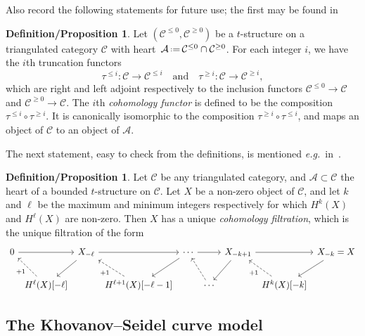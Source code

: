 \documentclass{amsart}
\theoremstyle{definition}
\newtheorem{defprop}[theorem]{Definition/Proposition}
\newcommand{\eqdef}{\mbox{\,\raisebox{0.2ex}{\scriptsize\ensuremath{\mathrm:}}\ensuremath{=}\,}} %
\newcommand{\eg}{\textit{e.g.}~} %
\newcommand{\darkblue}{\color{darkblue}} %
\newcommand{\defn}[1]{\textsl{\darkblue #1}} %
\begin{document}
Also record the following statements for future use; the first may be found in~\cite[Sect.~1.3]{bel.ber.del:82}

\begin{defprop}
\label{defprop:cohomology}
Let \((\mathcal{C}^{\le 0}, \mathcal{C}^{\geq 0})\) be a \(t\)-structure on a triangulated category \(\mathcal{C}\) with heart~\(\mathcal{A} \eqdef \mathcal{C}^{\leq 0} \cap \mathcal{C}^{\geq 0}\).
For each integer \(i\), we have the \(i\)th truncation functors
\[
\tau^{\leq i} \colon \mathcal{C} \to \mathcal{C}^{\leq i} \quad\text{and}\quad \tau^{\geq i} \colon \mathcal{C} \to \mathcal{C}^{\geq i},
\]
which are right and left adjoint respectively to the inclusion functors \(\mathcal{C}^{\leq 0} \to \mathcal{C}\) and \(\mathcal{C}^{\geq 0} \to \mathcal{C}\).
The \(i\)th \defn{cohomology functor} is defined to be the composition \(\tau^{\leq i} \circ \tau^{\geq i}\).
It is canonically isomorphic to the composition \(\tau^{\geq i} \circ \tau^{\leq i}\), and maps an object of \(\mathcal{C}\) to an object of \(\mathcal{A}\).
\end{defprop}

The next statement, easy to check from the definitions, is mentioned \eg in~\cite[Sect.~3.3]{bayer2011tour}.

\begin{defprop}
\label{defprop:cohomology-filtration}
Let \(\mathcal{C}\) be any triangulated category, and \(\mathcal{A} \subset \mathcal{C}\) the heart of a bounded \(t\)-structure on \(\mathcal{C}\).
Let \(X\) be a non-zero object of \(\mathcal{C}\), and let \(k\) and \(\ell\) be the maximum and minimum integers respectively for which \(H^k(X)\) and \(H^\ell(X)\) are non-zero.
Then \(X\) has a unique \defn{cohomology filtration}, which is the unique filtration of the form
\[
\begin{tikzcd}[column sep=0.1cm]
	0  \arrow{rr} && X_{-\ell} \arrow{dl} \arrow{rr} && \cdots \arrow{rr} \arrow{dl} && X_{-k+1} \arrow{rr} \arrow{dl} && X_{-k} = X \arrow{dl}\\
	& H^\ell(X)[-\ell] \arrow[dashed]{ul}{+1} && H^{\ell+1}(X)[-\ell-1] \arrow[dashed]{ul}{+1} && \cdots \arrow[dashed]{ul} &&H^k(X)[-k] \arrow[dashed]{ul}{+1}
\end{tikzcd}
\]  
\end{defprop}


\subsection{The Khovanov--Seidel curve model}
\label{subsec:KSCurveModel}
\end{document}
